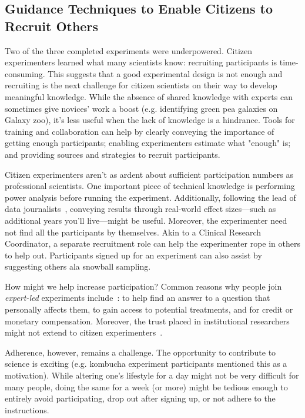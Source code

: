 \subsection{Guidance Techniques to Enable Citizens to Recruit Others}
Two of the three completed experiments were underpowered. Citizen experimenters learned what many scientists know: recruiting participants is time-consuming. This suggests that a good experimental design is not enough and recruiting is the next challenge for citizen scientists on their way to develop meaningful knowledge. While the absence of shared knowledge with experts can sometimes give novices' work a boost (e.g. identifying green pea galaxies on Galaxy zoo), it's less useful when the lack of knowledge is a hindrance. Tools for training and collaboration can help by clearly conveying the importance of getting enough participants; enabling experimenters estimate what "enough" is; and providing sources and strategies to recruit participants.

Citizen experimenters aren't as ardent about sufficient participation numbers as professional scientists. One important piece of technical knowledge is performing power analysis before running the experiment. Additionally, following the lead of data journalists~\cite{Gray2012}, conveying results through real-world effect sizes---such as additional years you'll live---might be useful. Moreover, the experimenter need not find all the participants by themselves. Akin to a Clinical Research Coordinator, a separate recruitment role can help the experimenter rope in others to help out. Participants signed up for an experiment can also assist by suggesting others ala snowball sampling.

How might we help increase participation? Common reasons why people join \textit{expert-led} experiments include~\cite{NIH2015}: to help find an answer to a question that personally affects them, to gain access to potential treatments, and for credit or monetary compensation. Moreover, the trust placed in institutional researchers might not extend to citizen experimenters~\cite{Cooper2014}. 

Adherence, however, remains a challenge. The opportunity to contribute to science is exciting (e.g. kombucha experiment participants mentioned this as a motivation). While altering one's lifestyle for a day might not be very difficult for many people, doing the same for a week (or more) might be tedious enough to entirely avoid participating, drop out after signing up, or not adhere to the instructions.

